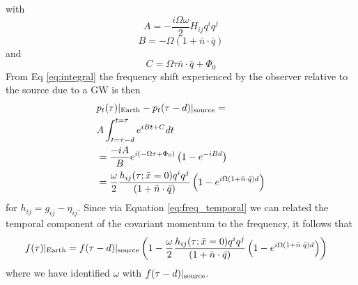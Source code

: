 \documentclass[fleqn,usenatbib,useAMS]{mnras}
\begin{document}
with 
\begin{equation}
	A = -\frac{i\Omega \omega}{2} H_{ij}q^i q^j 
\end{equation}
\begin{equation}
	B = -\Omega (1 + \bar{n}\cdot \bar{q}) 
\end{equation}
and 
\begin{equation}
	C = \Omega \tau \bar{n} \cdot \bar{q}  +\Phi_0
\end{equation}
From Eq \ref{eq:integral} the frequency shift experienced by the observer relative to the source due to a GW is then
\begin{align}
	&p_t(\tau)|_{\rm Earth} - p_t(\tau - d)|_{\rm source} = \\
	 & A \int_{t = \tau - d}^{t=\tau} e^{i B t + C}dt  \\
	& =\frac{-iA}{B} e^{i(-\Omega \tau +\Phi_0)} \left(1 -e^{-i B d}\right) \\
	&= \frac{\omega}{2} \frac{ h_{ij} (\tau; \bar{x}= 0)q^i q^j }{(1 + \bar{n}\cdot \bar{q}) }  \left(1 -e^{i \Omega (1 + \bar{n}\cdot \bar{q})  d}\right)
	\label{eq:concise}
\end{align}
for $h_{ij} = g_{ij} - \eta_{ij}$. Since via Equation  \ref{eq:freq_temporal} we can related the temporal component of the covariant momentum to the frequency, it follows that
\begin{align}
	&f(\tau)|_{\rm Earth} = f(\tau - d)|_{\rm source}  \left( 1- \frac{\omega}{2} \frac{ h_{ij} (\tau; \bar{x}= 0)q^i q^j }{(1 + \bar{n}\cdot \bar{q}) }  \left(1 -e^{i \Omega (1 + \bar{n}\cdot \bar{q})  d}\right) \right)
	\label{eq:main_eq}
\end{align}
where we have identified $\omega$ with $f(\tau - d)|_{\rm source}$. 
\end{document}
